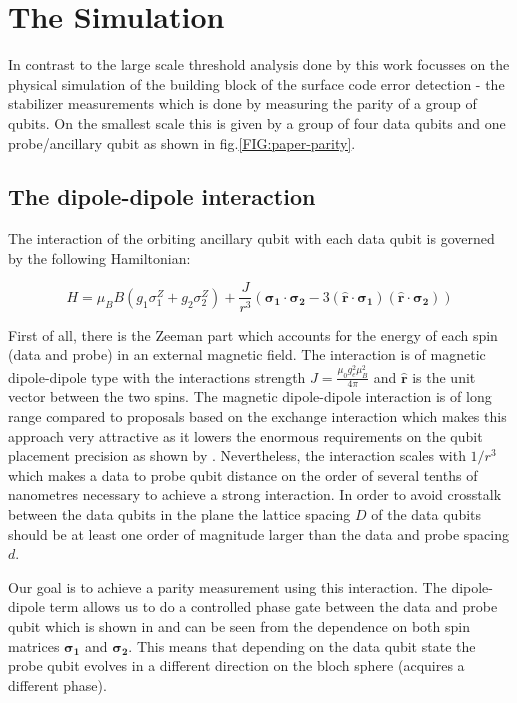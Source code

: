 \section{The Simulation}
In contrast to the large scale threshold analysis done by \citet{OGorman2016} this work focusses on the physical simulation of the building block of the surface code error detection - the stabilizer measurements which is done by measuring the parity of a group of qubits. On the smallest scale this is given by a group of four data qubits and one probe/ancillary qubit as shown in fig.\@ \ref{FIG:paper-parity}. 

\subsection{The dipole-dipole interaction}\label{sec:dipole-dipole}

The interaction of the orbiting ancillary qubit with each data qubit is governed by the following Hamiltonian:

\begin{equation*}
H = \mu_B B( g_1 \sigma_1^Z + g_2 \sigma_2^Z) + \frac{J}{r^3} ( \mathbf{\sigma_1} \cdot \mathbf{\sigma_2} - 3 ( \hat{\mathbf{r}} \cdot \mathbf{\sigma_1}) ( \hat{\mathbf{r}}\cdot \mathbf{\sigma_2}))
\end{equation*}

First of all, there is the Zeeman part which accounts for the energy of each spin (data and probe) in an external magnetic field. The interaction is of magnetic dipole-dipole type with the interactions strength $J=\frac{\mu_0 g_e^2 \mu_B^2}{4\pi}$ and $\hat{\mathbf{r}}$ is the unit vector between the two spins. The magnetic dipole-dipole interaction is of long range compared to proposals based on the exchange interaction \cite{Kane1998a} which makes this approach very attractive as it lowers the enormous requirements on the qubit placement precision as shown by \citet{OGorman2016}. Nevertheless, the interaction scales with $1/r^3$ which makes a data to probe qubit distance on the order of several tenths of nanometres necessary to achieve a strong interaction. In order to avoid crosstalk between the data qubits in the plane the lattice spacing $D$ of the data qubits should be at least one order of magnitude larger than the data and probe spacing $d$. 

Our goal is to achieve a parity measurement using this interaction. The dipole-dipole term allows us to do a controlled phase gate between the data and probe qubit which is shown in \cite{OGorman2016} and can be seen from the dependence on both spin matrices $\mathbf{\sigma_1}$ and $\mathbf{\sigma_2}$. This means that depending on the data qubit state the probe qubit evolves in a different direction on the bloch sphere (acquires a different phase). 

